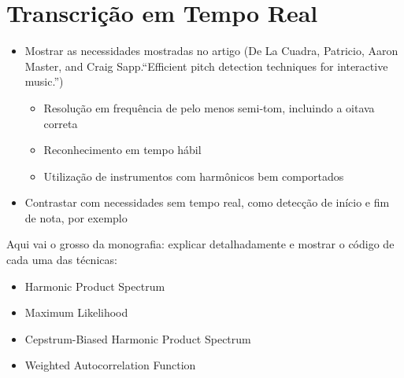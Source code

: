 \section{Transcrição em Tempo Real}
\label{sec:temporeal}

\begin{itemize}
\item Mostrar as necessidades mostradas no artigo (De La Cuadra, Patricio, Aaron Master, and Craig Sapp.``Efficient pitch detection techniques for interactive music.'')
	\begin{itemize}
	\item Resolução em frequência de pelo menos semi-tom, incluindo a oitava correta
	\item Reconhecimento em tempo hábil
	\item Utilização de instrumentos com harmônicos bem comportados
	\end{itemize}
\item Contrastar com necessidades sem tempo real, como detecção de início e fim de nota, por exemplo
\end{itemize}

Aqui vai o grosso da monografia: explicar detalhadamente e mostrar o código de cada uma das técnicas:

\begin{itemize}
\item Harmonic Product Spectrum
\item Maximum Likelihood
\item Cepstrum-Biased Harmonic Product Spectrum
\item Weighted Autocorrelation Function
\end{itemize}